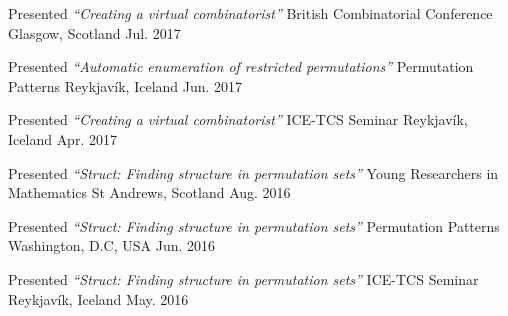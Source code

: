 


\begin{cventries}

\cventrypresentation
  {Presented \textit{``Creating a virtual combinatorist''}} %
  {British Combinatorial Conference} %
  {Glasgow, Scotland} %
  {Jul. 2017} %


\cventrypresentation
  {Presented \textit{``Automatic enumeration of restricted permutations''}} %
  {Permutation Patterns} %
  {Reykjavík, Iceland} %
  {Jun. 2017} %


\cventrypresentation
  {Presented \textit{``Creating a virtual combinatorist''}} %
  {ICE-TCS Seminar} %
  {Reykjavík, Iceland} %
  {Apr. 2017} %


\cventrypresentation
  {Presented \textit{``Struct: Finding structure in permutation sets''}} %
  {Young Researchers in Mathematics} %
  {St Andrews, Scotland} %
  {Aug. 2016} %


\cventrypresentation
  {Presented \textit{``Struct: Finding structure in permutation sets''}} %
  {Permutation Patterns} %
  {Washington, D.C, USA} %
  {Jun. 2016} %


\cventrypresentation
  {Presented \textit{``Struct: Finding structure in permutation sets''}} %
  {ICE-TCS Seminar} %
  {Reykjavík, Iceland} %
  {May. 2016} %



\end{cventries}
